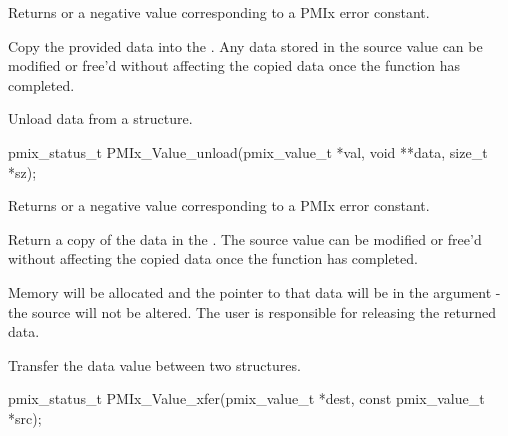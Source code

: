 Returns  or a negative value corresponding to a PMIx error constant.

\descr

Copy the provided data into the . Any data stored in the source value can be modified or free'd without affecting the copied data once the function has completed.


\summary

Unload data from a  structure.

\format

\cspecificstart
\begin{codepar}
pmix_status_t
PMIx_Value_unload(pmix_value_t *val,
                  void **data,
                  size_t *sz);
\end{codepar}
\cspecificend

\begin{arglist}
\end{arglist}

Returns  or a negative value corresponding to a PMIx error constant.

\descr

Return a copy of the data in the . The source value can be modified or free'd without affecting the copied data once the function has completed.

\adviceuserstart
Memory will be allocated and the pointer to that data will be in the  argument - the source  will not be altered. The user is responsible for releasing the returned data.
\adviceuserend


\summary

Transfer the data value between two  structures.

\format

\cspecificstart
\begin{codepar}
pmix_status_t
PMIx_Value_xfer(pmix_value_t *dest,
                const pmix_value_t *src);
\end{codepar}
\cspecificend

